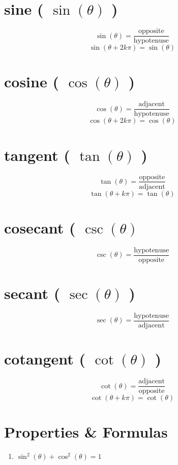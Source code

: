 \section{sine ( $\sin(\theta)$ )}\label{sine (sin)}

\[
    \sin(\theta) = \displaystyle \dfrac{\mathrm{opposite}}{\mathrm{hypotenuse}}
\]
\[    \sin(\theta + 2k\pi) = \sin(\theta)   \]

\section{cosine ( $\cos(\theta)$ )}\label{cosine (cos)}

\[
    \cos(\theta) = \displaystyle\dfrac{\mathrm {adjacent} }{\mathrm {hypotenuse} }
\]
\[  \cos(\theta + 2k\pi ) = \cos(\theta)  \]

\section{tangent ( $\tan(\theta)$ )}\label{tangent (tan)}

\[
    \tan(\theta) =\displaystyle \dfrac {\mathrm {opposite} }{\mathrm {adjacent} }
\]
\[  \tan(\theta + k\pi ) = \tan(\theta)  \]

\section{cosecant ( $\csc(\theta)$ }\label{cosecant (csc)}
\[
    \csc(\theta) =\displaystyle\dfrac {\mathrm {hypotenuse} }{\mathrm {opposite} }
\]

\section{secant ( $\sec(\theta)$ )}\label{secant (sec)}
\[
    \sec(\theta) =\displaystyle\dfrac {\mathrm {hypotenuse} }{\mathrm {adjacent} }
\]

\section{cotangent ( $\cot(\theta)$ )}\label{cotangent (cot)}

\[
    \cot(\theta) =\displaystyle\dfrac {\mathrm {adjacent} }{\mathrm {opposite} }
\]
\[  \cot(\theta + k\pi ) = \cot(\theta)  \]


\section*{Properties \& Formulas}
\begin{enumerate}
    \item \( \sin^2(\theta) + \cos^2(\theta) = 1 \)
\end{enumerate}



